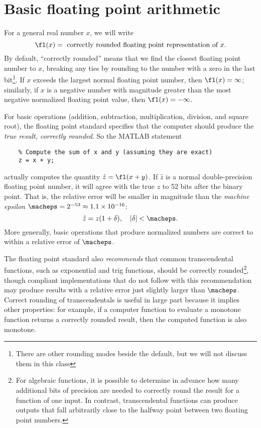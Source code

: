 \section{Basic floating point arithmetic}

For a general real number $x$, we will write
\[
  \fl(x) = \mbox{ correctly rounded floating point representation of } x.
\]
By default, ``correctly rounded'' means that we find the closest
floating point number to $x$, breaking any ties by rounding to the
number with a zero in the last bit\footnote{%
There are other rounding modes beside the default, but we will not
discuss them in this class}.
If $x$ exceeds the largest normal floating point number,
then $\fl(x) = \infty$; similarly, if $x$ is a negative number
with magnitude greater than the most negative normalized floating
point value, then $\fl(x) = -\infty$.

For basic operations (addition, subtraction, multiplication,
division, and square root), the floating point standard specifies that
the computer should produce the {\em true result, correctly rounded}.
So the MATLAB statement
\lstset{language=matlab,columns=flexible}
\begin{lstlisting}
    % Compute the sum of x and y (assuming they are exact)
    z = x + y;
\end{lstlisting}
actually computes the quantity $\hat{z} = \fl(x+y)$.  If $\hat{z}$ is
a normal double-precision floating point number, it will agree with
the true $z$ to 52 bits after the binary point.  That is, the relative
error will be smaller in magnitude than the {\em machine epsilon}
$\macheps = 2^{-53} \approx 1.1 \times 10^{-16}$:
\[
  \hat{z} = z(1+\delta), \quad |\delta| < \macheps.
\]
More generally, basic operations that produce normalized numbers are
correct to within a relative error of $\macheps$.

The floating
point standard also {\em recommends} that common transcendental functions,
such as exponential and trig functions, should be correctly rounded\footnote{%
For algebraic functions, it is possible to determine in advance how many
additional bits of precision are needed to correctly round the result
for a function of one input.  In contrast, transcendental functions
can produce outputs that fall arbitrarily close to the halfway point
between two floating point numbers.
},
though compliant implementations that do not follow with this
recommendation may produce results with a relative error
just slightly larger than $\macheps$.
Correct rounding of transcendentals is useful in large part because it
implies other properties: for example, if a computer function to evaluate
a monotone function returns a correctly rounded result, then the computed
function is also monotone.

